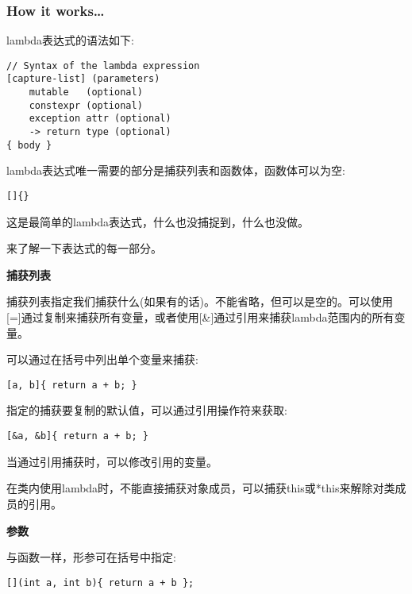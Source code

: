 \subsubsection{How it works…}

lambda表达式的语法如下:

\begin{lstlisting}[style=styleCXX]
// Syntax of the lambda expression
[capture-list] (parameters)
	mutable   (optional)
	constexpr (optional)
	exception attr (optional)
	-> return type (optional)
{ body }
\end{lstlisting}

lambda表达式唯一需要的部分是捕获列表和函数体，函数体可以为空:

\begin{lstlisting}[style=styleCXX]
[]{}
\end{lstlisting}

这是最简单的lambda表达式，什么也没捕捉到，什么也没做。

来了解一下表达式的每一部分。

\noindent
\textbf{捕获列表}

捕获列表指定我们捕获什么(如果有的话)。不能省略，但可以是空的。可以使用[=]通过复制来捕获所有变量，或者使用[\&]通过引用来捕获lambda范围内的所有变量。

可以通过在括号中列出单个变量来捕获:

\begin{lstlisting}[style=styleCXX]
[a, b]{ return a + b; }
\end{lstlisting}

指定的捕获要复制的默认值，可以通过引用操作符来获取:

\begin{lstlisting}[style=styleCXX]
[&a, &b]{ return a + b; }
\end{lstlisting}

当通过引用捕获时，可以修改引用的变量。

\begin{tcolorbox}[colback=webgreen!5!white,colframe=webgreen!75!black,title=Note]
在类内使用lambda时，不能直接捕获对象成员，可以捕获this或*this来解除对类成员的引用。
\end{tcolorbox}

\noindent
\textbf{参数}

与函数一样，形参可在括号中指定:

\begin{lstlisting}[style=styleCXX]
[](int a, int b){ return a + b };
\end{lstlisting}

